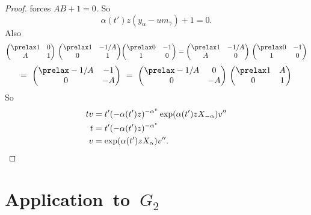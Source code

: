 \documentclass{memo-l}
\theoremstyle{definition}
\theoremstyle{remark}
\numberwithin{section}{chapter}
\numberwithin{equation}{chapter}
\begin{document}
\begin{proof}
\noindent
forces  $AB + 1 = 0$.  So
$$
{\alpha}(t')z(y_{{\alpha}}-um_{{\gamma}})+1 = 0 .
$$
Also
$$
{\begin{pmatrix} \prelax  1 & 0 \\ A & 1 \end{pmatrix}}\ {\begin{pmatrix} \prelax  1 & -1/A \\ 0 & 1 \end{pmatrix}}
{\begin{pmatrix} \prelax  0 & -1 \\ 1 & 0 \end{pmatrix}} = {\begin{pmatrix} \prelax  1 & -1/A \\ A & 0 \end{pmatrix}}\
{\begin{pmatrix} \prelax  0 & -1 \\ 1 & 0 \end{pmatrix}}
$$
$$
=\ {\begin{pmatrix} \prelax  -1/A & -1 \\ 0 & -A \end{pmatrix}}\ =\ 
{\begin{pmatrix} \prelax  -1/A & 0 \\ 0 & -A \end{pmatrix}}\ {\begin{pmatrix} \prelax  1 & A \\ 0 & 1 \end{pmatrix}}
$$
So
$$
\aligned
tv &= t'(-{\alpha}(t')z)^{-\alpha^v} \exp({\alpha}(t')zX_{-{\alpha}})v'' \\
t &= t'(-{\alpha}(t')z)^{-\alpha^v} \\
v &= \exp({\alpha}(t')zX_{{\alpha}})v'' .
\endaligned
$$
\end{proof} 








\section{Application\ to\ $G_2$}
\end{document}
